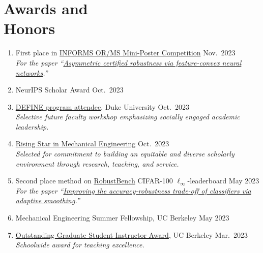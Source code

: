 \documentclass[11pt]{article}
\newcommand{\cvdate}[1]{\hfill#1}			%
\begin{document}
	\section{\texorpdfstring{Awards and \\[\baselineskip] Honors}{Awards and Honors}}
	\hfill\vspace*{-2\baselineskip}
	\begin{enumerate}[label={\arabic*.}]
		\item First place in \href{https://www.informs.org/Publications/OR-MS-Tomorrow/OR-MS-Tomorrow-Mini-Poster-Competition-2023-Winners}{INFORMS OR/MS Mini-Poster Competition}
		\cvdate{Nov.\ 2023} \\
		\textit{For the paper ``\href{https://arxiv.org/pdf/2302.01961.pdf}{Asymmetric certified robustness via feature-convex neural networks}.''}
		\item NeurIPS Scholar Award
		\cvdate{Oct.\ 2023}
		\item \href{https://sites.google.com/view/duke-engineering-define/home}{DEFINE program attendee}, Duke University
		\cvdate{Oct.\ 2023} \\
		\textit{Selective future faculty workshop emphasizing socially engaged academic leadership.}
		\item \href{https://me.berkeley.edu/me-rising-stars/}{Rising Star in Mechanical Engineering}
		\cvdate{Oct.\ 2023} \\
		\textit{Selected for commitment to building an equitable and diverse scholarly environment through research, teaching, and service.}
		\item Second place method on \href{https://robustbench.github.io/#div_cifar100_Linf_heading}{RobustBench} CIFAR-100 $\ell_\infty$-leaderboard
		\cvdate{May 2023} \\
		\textit{For the paper ``\href{https://bai-yt.github.io/files/publications/AdaptiveSmoothing_PrePrint.pdf}{Improving the accuracy-robustness trade-off of classifiers via adaptive smoothing}.''}
		\item Mechanical Engineering Summer Fellowship, UC Berkeley
		\cvdate{May 2023}
		\item \href{https://gsi.berkeley.edu/programs-services/award-programs/ogsi/ogsi-recipients-2022-2023/}{Outstanding Graduate Student Instructor Award}, UC Berkeley
		\cvdate{Mar.\ 2023} \\
		\textit{Schoolwide award for teaching excellence.}

\end{enumerate}
\end{document}
